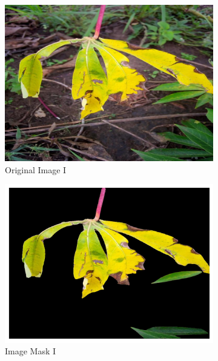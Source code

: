 \begin{figure}[t]
    \centering
    \begin{subfigure}[b]{0.22\linewidth}
        \centering
        \includegraphics[width=\linewidth]{graphs/samraw1.png}
        \caption{Original Image I}
        \label{fig:Original Image (1)}
    \end{subfigure}
    \hfill
    \begin{subfigure}[b]{0.22\linewidth}
        \centering
        \includegraphics[width=\linewidth]{graphs/sam1.png}
        \caption{Image Mask I}
        \label{fig:Segmentation mask (1)}
    \end{subfigure}
    \hfill
    \begin{subfigure}[b]{0.22\linewidth}

\end{subfigure}
\end{figure}
